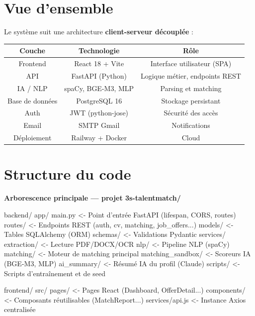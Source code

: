 \documentclass[12pt,a4paper]{report}
\newenvironment{codebox}[1][]{%
  \begin{framed}\noindent\textbf{\small\textcolor{codeblue}{#1}}\\[2pt]\ttfamily\small%
}{\end{framed}}
\begin{document}
\section{Vue d'ensemble}

Le système suit une architecture \textbf{client-serveur découplée} :

\begin{center}
\begin{tabular}{|c|c|c|}
\hline
\textbf{Couche} & \textbf{Technologie} & \textbf{Rôle} \\
\hline
Frontend & React 18 + Vite & Interface utilisateur (SPA) \\
API & FastAPI (Python) & Logique métier, endpoints REST \\
IA / NLP & spaCy, BGE-M3, MLP & Parsing et matching \\
Base de données & PostgreSQL 16 & Stockage persistant \\
Auth & JWT (python-jose) & Sécurité des accès \\
Email & SMTP Gmail & Notifications \\
Déploiement & Railway + Docker & Cloud \\
\hline
\end{tabular}
\end{center}

\section{Structure du code}

\begin{codebox}[Arborescence principale — projet 3s-talentmatch/]
backend/
  app/
    main.py           <- Point d'entrée FastAPI (lifespan, CORS, routes)
    routes/           <- Endpoints REST (auth, cv, matching, job_offers...)
    models/           <- Tables SQLAlchemy (ORM)
    schemas/          <- Validations Pydantic
    services/
      extraction/     <- Lecture PDF/DOCX/OCR
      nlp/            <- Pipeline NLP (spaCy)
      matching/       <- Moteur de matching principal
      matching_sandbox/ <- Scoreurs IA (BGE-M3, MLP)
      ai_summary/     <- Résumé IA du profil (Claude)
  scripts/            <- Scripts d'entraînement et de seed

frontend/
  src/
    pages/            <- Pages React (Dashboard, OfferDetail...)
    components/       <- Composants réutilisables (MatchReport...)
    services/api.js   <- Instance Axios centralisée
\end{codebox}
\end{document}
